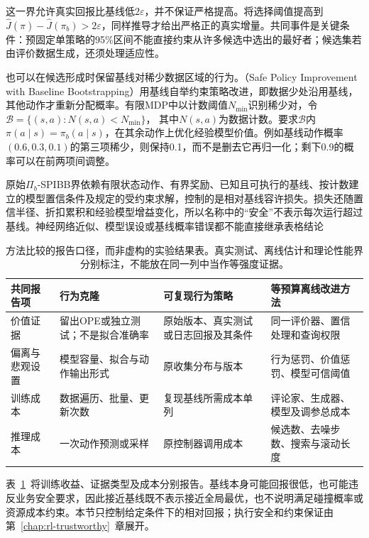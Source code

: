 这一界允许真实回报比基线低$2\varepsilon$，并不保证严格提高。将选择阈值提高到
$\widehat J(\widehat\pi)-\widehat J(\pi_b)>2\varepsilon$，同样推导才给出严格正的真实增量。共同事件是关键条件：预固定单策略的95\%区间不能直接约束从许多候选中选出的最好者；候选集若由评价数据生成，还须处理适应性。

也可以在候选形成时保留基线对稀少数据区域的行为。（Safe Policy Improvement with Baseline Bootstrapping）用基线自举约束策略改进，即数据少处沿用基线，其他动作才重新分配概率。有限MDP中以计数阈值$N_{\min}$识别稀少对，令
$\mathcal B=\{(s,a):N(s,a)<N_{\min}\}$，
其中$N(s,a)$为数据计数。要求$\mathcal B$内$\pi(a\mid s)=\pi_b(a\mid s)$，在其余动作上优化经验模型价值。例如基线动作概率$(0.6,0.3,0.1)$的第三项稀少，则保持0.1，而不是删去它再归一化；剩下0.9的概率可以在前两项间调整。

原始$\Pi_b$-SPIBB界依赖有限状态动作、有界奖励、已知且可执行的基线、按计数建立的模型置信条件及规定的受约束求解，控制的是相对基线容许损失。损失还随置信半径、折扣累积和经验模型增益变化，所以名称中的“安全”不表示每次运行超过基线。神经网络近似、模型误设或基线概率错误都不能直接继承表格结论

\begin{table}[t]
  \centering
  \small
  \begin{tabularx}{\linewidth}{p{28mm}XXX}
    \toprule
    共同报告项 & 行为克隆 & 可复现行为策略 & 等预算离线改进方法 \\
    \midrule
    价值证据 & 留出OPE或独立测试；不是拟合准确率 & 原始版本、真实测试或日志回报及其条件 & 同一评价器、置信处理和查询权限 \\
    偏离与悲观设置 & 模型容量、拟合与动作输出形式 & 原收集分布与版本 & 行为惩罚、价值惩罚、模型可信阈值 \\
    训练成本 & 数据遍历、批量、更新次数 & 复现基线所需成本单列 & 评论家、生成器、模型及调参总成本 \\
    推理成本 & 一次动作预测或采样 & 原控制器调用成本 & 候选数、去噪步数、搜索与滚动长度 \\
    \bottomrule
  \end{tabularx}
  \caption{方法比较的报告口径，而非虚构的实验结果表。真实测试、离线估计和理论性能界分别标注，不能放在同一列中当作等强度证据。}
  \label{tab:rl-information-reporting}
\end{table}

表~\ref{tab:rl-information-reporting}~将训练收益、证据类型及成本分别报告。基线本身可能回报很低，也可能违反业务安全要求，因此接近基线既不表示接近全局最优，也不说明满足碰撞概率或资源成本约束。本节只控制给定条件下的相对回报；执行安全和约束保证由第~\ref{chap:rl-trustworthy}~章展开。

